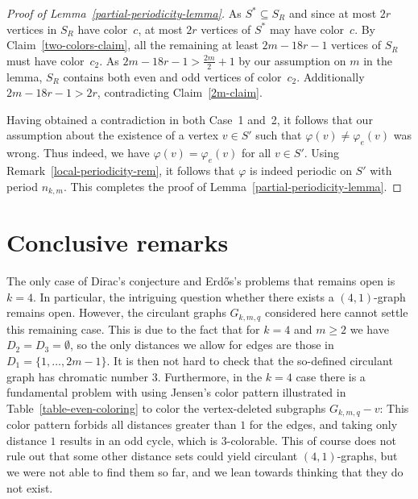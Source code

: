 \documentclass[a4paper,10pt,hidelinks]{amsart}
\renewcommand{\phi}{\ensuremath{\varphi}}
\theoremstyle{definition}
\begin{document}
\begin{proof}[Proof of Lemma~\ref{partial-periodicity-lemma}]
    As $S^\ast \subseteq S_R$ and since at most $2r$ vertices in $S_R$ have color~$c$, at most $2r$ vertices of $S^\ast$ may have color~$c$. By Claim~\ref{two-colors-claim}, all the remaining at least $2m - 18r - 1$ vertices of $S_R$ must have color~$c_2$. As $2m - 18r - 1 > \frac{2m}{2} + 1$ by our assumption on $m$ in the lemma, $S_R$ contains both even and odd vertices of color~$c_2$. Additionally $2m - 18r - 1 > 2r$, contradicting Claim~\ref{2m-claim}. 

    \medskip

    Having obtained a contradiction in both Case~1 and~2, it follows that our assumption about the existence of a vertex $v\in S'$ such that $\varphi(v) \neq \varphi_e(v)$ was wrong. Thus indeed, we have $\phi(v)=\phi_e(v)$ for all $v\in S'$. Using Remark~\ref{local-periodicity-rem}, it follows that $\phi$ is indeed periodic on $S'$ with period $n_{k,m}$. 
    This completes the proof of Lemma~\ref{partial-periodicity-lemma}.
\end{proof}

\section{Conclusive remarks}\label{sec:conc}
The only case of Dirac's conjecture and Erd\H{o}s's problems that remains open is $k=4$. In particular, the intriguing question whether there exists a $(4,1)$-graph remains open. However, the circulant graphs $G_{k,m,q}$ considered here cannot settle this remaining case. This is due to the fact that for $k=4$ and $m\ge 2$ we have $D_2=D_3=\emptyset$, so the only distances we allow for edges are those in $D_1=\{1,\ldots,2m-1\}$. It is then not hard to check that the so-defined circulant graph has chromatic number $3$. Furthermore, in the $k=4$ case there is a fundamental problem with using Jensen's color pattern illustrated in Table~\ref{table-even-coloring} to color the vertex-deleted subgraphs $G_{k,m,q}-v$: This color pattern forbids all distances greater than $1$ for the edges, and taking only distance $1$ results in an odd cycle, which is $3$-colorable. This of course does not rule out that some other distance sets could yield circulant $(4,1)$-graphs, but we were not able to find them so far, and we lean towards thinking that they do not exist.
\end{document}
